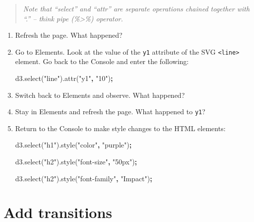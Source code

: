 \documentclass[openany]{book}
\newenvironment{Shaded}{\begin{snugshade}}{\end{snugshade}}
\newcommand{\AttributeTok}[1]{\textcolor[rgb]{0.77,0.63,0.00}{#1}}
\newcommand{\NormalTok}[1]{#1}
\newcommand{\OperatorTok}[1]{\textcolor[rgb]{0.81,0.36,0.00}{\textbf{#1}}}
\newcommand{\StringTok}[1]{\textcolor[rgb]{0.31,0.60,0.02}{#1}}
\newcommand{\VariableTok}[1]{\textcolor[rgb]{0.00,0.00,0.00}{#1}}
\begin{document}
\begin{quote}
 \emph{Note that ``select'' and ``attr'' are separate operations chained together with ``.'' -- think pipe (\%\textgreater{}\%) operator.}
\end{quote}

\begin{enumerate}
\def\labelenumi{\arabic{enumi}.}
\setcounter{enumi}{1}
\item
  Refresh the page. What happened?
\item
  Go to Elements. Look at the value of the \texttt{y1} attribute of the SVG \texttt{\textless{}line\textgreater{}} element. Go back to the Console and enter the following:

\begin{Shaded}
\begin{Highlighting}[]
\VariableTok{d3}\NormalTok{.}\AttributeTok{select}\NormalTok{(}\StringTok{"line"}\NormalTok{).}\AttributeTok{attr}\NormalTok{(}\StringTok{"y1"}\OperatorTok{,} \StringTok{"10"}\NormalTok{)}\OperatorTok{;}
\end{Highlighting}
\end{Shaded}
\item
  Switch back to Elements and observe. What happened?
\item
  Stay in Elements and refresh the page. What happened to \texttt{y1}?
\item
  Return to the Console to make style changes to the HTML elements:

\begin{Shaded}
\begin{Highlighting}[]
\VariableTok{d3}\NormalTok{.}\AttributeTok{select}\NormalTok{(}\StringTok{"h1"}\NormalTok{).}\AttributeTok{style}\NormalTok{(}\StringTok{"color"}\OperatorTok{,} \StringTok{"purple"}\NormalTok{)}\OperatorTok{;}

\VariableTok{d3}\NormalTok{.}\AttributeTok{select}\NormalTok{(}\StringTok{"h2"}\NormalTok{).}\AttributeTok{style}\NormalTok{(}\StringTok{"font-size"}\OperatorTok{,} \StringTok{"50px"}\NormalTok{)}\OperatorTok{;}

\VariableTok{d3}\NormalTok{.}\AttributeTok{select}\NormalTok{(}\StringTok{"h2"}\NormalTok{).}\AttributeTok{style}\NormalTok{(}\StringTok{"font-family"}\OperatorTok{,} \StringTok{"Impact"}\NormalTok{)}\OperatorTok{;}
\end{Highlighting}
\end{Shaded}
\end{enumerate}

\hypertarget{add-transitions}{%
\section{Add transitions }\label{add-transitions}}
\end{document}
